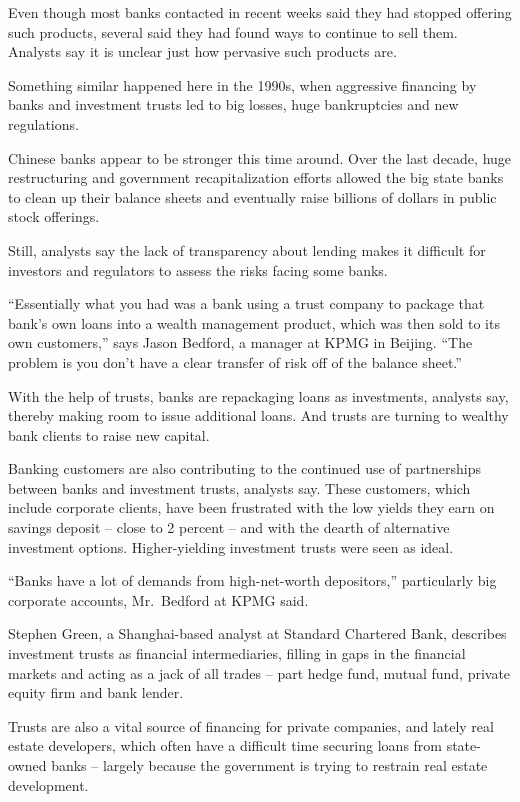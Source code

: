 ﻿\documentclass[12pt]{article}
\begin{document}
Even though most banks contacted in recent weeks said they had stopped offering such products,
several said they had found ways to continue to sell them. Analysts say it is unclear just how
pervasive such products are.

Something similar happened here in the 1990s, when aggressive financing by banks and investment
trusts led to big losses, huge bankruptcies and new regulations.

Chinese banks appear to be stronger this time around. Over the last decade, huge restructuring and
government recapitalization efforts allowed the big state banks to clean up their balance sheets and
eventually raise billions of dollars in public stock offerings.

Still, analysts say the lack of transparency about lending makes it difficult for investors and
regulators to assess the risks facing some banks.

``Essentially what you had was a bank using a trust company to package that bank's own loans into a
wealth management product, which was then sold to its own customers,'' says Jason Bedford, a manager
at KPMG in Beijing. ``The problem is you don't have a clear transfer of risk off of the balance
sheet.''

With the help of trusts, banks are repackaging loans as investments, analysts say, thereby making
room to issue additional loans. And trusts are turning to wealthy bank clients to raise new capital.

Banking customers are also contributing to the continued use of partnerships between banks and
investment trusts, analysts say. These customers, which include corporate clients, have been
frustrated with the low yields they earn on savings deposit -- close to 2 percent -- and with the
dearth of alternative investment options. Higher-yielding investment trusts were seen as ideal.

``Banks have a lot of demands from high-net-worth depositors,'' particularly big corporate accounts,
Mr.~Bedford at KPMG said.

Stephen Green, a Shanghai-based analyst at Standard Chartered Bank, describes investment trusts as
financial intermediaries, filling in gaps in the financial markets and acting as a jack of all
trades -- part hedge fund, mutual fund, private equity firm and bank lender.

Trusts are also a vital source of financing for private companies, and lately real estate
developers, which often have a difficult time securing loans from state-owned banks -- largely
because the government is trying to restrain real estate development.
\end{document}
